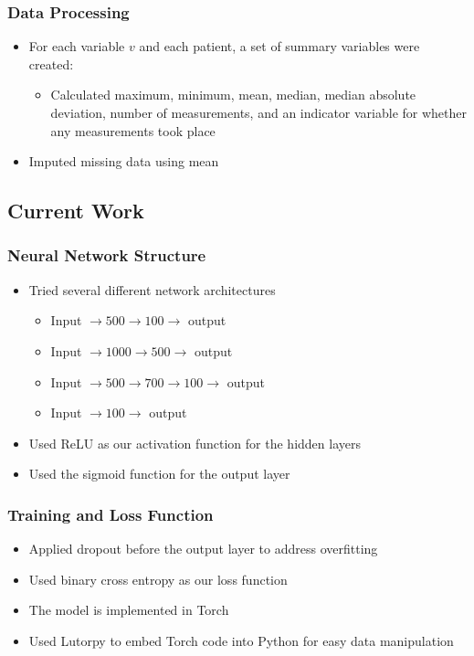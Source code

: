 \documentclass[table]{beamer}
\begin{document}
\begin{frame}
	\frametitle{Data Processing}
	\begin{itemize}
		\item For each variable $v$ and each patient, a set of summary variables were created:
		\begin{itemize}
			\item Calculated maximum, minimum, mean, median, median absolute deviation, number of measurements, and an indicator variable for whether any measurements took place
		\end{itemize}
		\item Imputed missing data using mean
	\end{itemize}
\end{frame}


\subsection{Current Work}

\begin{frame}
	\frametitle{Neural Network Structure}
	\begin{itemize}
		\item Tried several different network architectures
		\begin{itemize}
			\item Input $\to 500 \to 100 \to$ output
			\item Input $\to 1000 \to 500 \to$ output
			\item Input $\to 500 \to 700 \to 100 \to$ output
			\item Input $\to 100 \to$ output
		\end{itemize}
		\item Used ReLU as our activation function for the hidden layers
		\item Used the sigmoid function for the output layer
	\end{itemize}
\end{frame}

\begin{frame}
	\frametitle{Training and Loss Function}
	\begin{itemize}
		\item Applied dropout before the output layer to address overfitting
		\item Used binary cross entropy as our loss function
		\item The model is implemented in Torch
		\item Used Lutorpy to embed Torch code into Python for easy data manipulation
	\end{itemize}
\end{frame}
\end{document}
